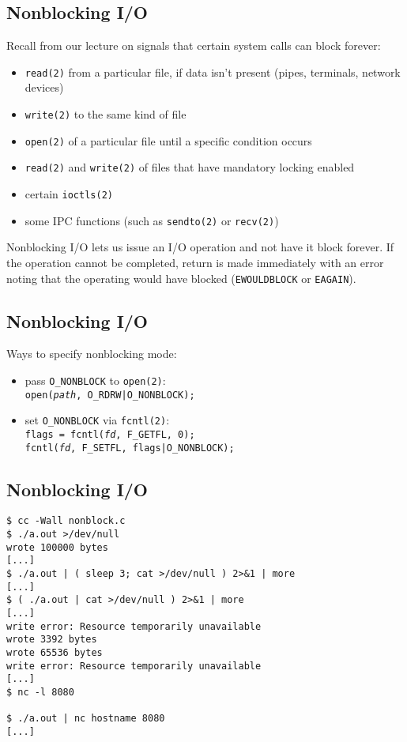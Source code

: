 \documentclass[xga]{xdvislides}
\begin{document}
\subsection{Nonblocking I/O}
Recall from our lecture on signals that certain system calls can block forever:
\begin{itemize}
	\item {\tt read(2)} from a particular file, if data isn't present (pipes,
		terminals, network devices)
	\item {\tt write(2)} to the same kind of file
	\item {\tt open(2)} of a particular file until a specific condition occurs
	\item {\tt read(2)} and {\tt write(2)} of files that have mandatory
		locking enabled
	\item certain {\tt ioctls(2)}
	\item some IPC functions (such as {\tt sendto(2)} or {\tt recv(2)})
\end{itemize}
\vspace{.25in}
Nonblocking I/O lets us issue an I/O operation and not have it block forever.
If the operation cannot be completed, return is made immediately with an error
noting that the operating would have blocked ({\tt EWOULDBLOCK} or {\tt EAGAIN}).

\subsection{Nonblocking I/O}
Ways to specify nonblocking mode:
\begin{itemize}
	\item pass {\tt O\_NONBLOCK} to {\tt open(2)}: \\

		{\tt open({\em path}, O\_RDRW|O\_NONBLOCK);}
		\vspace{.2in}
	\item set {\tt O\_NONBLOCK} via {\tt fcntl(2)}: \\

		{\tt flags = fcntl({\em fd}, F\_GETFL, 0); \\
		     fcntl({\em fd}, F\_SETFL, flags|O\_NONBLOCK);}
\end{itemize}

\subsection{Nonblocking I/O}
\begin{verbatim}
$ cc -Wall nonblock.c
$ ./a.out >/dev/null
wrote 100000 bytes
[...]
$ ./a.out | ( sleep 3; cat >/dev/null ) 2>&1 | more
[...]
$ ( ./a.out | cat >/dev/null ) 2>&1 | more
[...]
write error: Resource temporarily unavailable
wrote 3392 bytes
wrote 65536 bytes
write error: Resource temporarily unavailable
[...]
$ nc -l 8080

$ ./a.out | nc hostname 8080
[...]
\end{verbatim}
\end{document}
